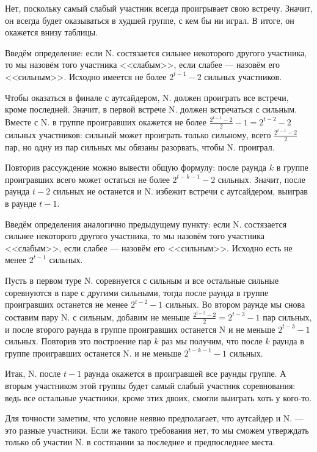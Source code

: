 \begin{itemize}
\itA Нет, поскольку самый слабый участник всегда проигрывает свою встречу.
Значит, он всегда будет оказываться в худшей группе, с кем бы ни играл.
В итоге, он окажется внизу таблицы.

\itB Введём определение: если N. состязается сильнее некоторого другого участника,
то мы назовём того участника <<слабым>>, если слабее --- назовём его <<сильным>>.
Исходно имеется не более $2^{t-1}-2$ сильных участников.

Чтобы оказаться в финале с аутсайдером, N. должен проиграть все встречи,
кроме последней. Значит, в первой встрече N. должен встречаться с сильным.
Вместе с N. в группе проигравших окажется не более $\frac{2^{t-1}-2}{2}-1 = 2^{t-2}-2$ 
сильных участников: сильный может проиграть только сильному, всего 
$\frac{2^{t-1}-2}{2}$ пар, но одну из пар сильных мы обязаны разорвать, чтобы 
N. проиграл.

Повторив рассуждение можно вывести общую формулу: после раунда $k$ 
в группе проигравших всего может остаться не более $2^{t-k-1}-2$ сильных. 
Значит, после раунда $t-2$ сильных не останется и N. избежит встречи с аутсайдером, 
выиграв в раунде $t-1$.

\itC Введём определения аналогично предыдущему пункту: если N. состязается сильнее 
некоторого другого участника, то мы назовём того участника <<слабым>>, если 
слабее --- назовём его <<сильным>>. Исходно есть не менее $2^{t-1}$ сильных. 

Пусть в первом туре N. соревнуется с сильным и все остальные сильные соревнуются 
в паре с другими сильными, 
тогда после раунда в группе проигравших останется не менее $2^{t-2}-1$ сильных.
Во втором раунде мы снова составим пару N. с сильным, добавим не меньше $\frac{2^{t-2}-2}{2} = 2^{t-3}-1$ 
пар сильных, и после второго раунда в группе проигравших останется N и
не меньше $2^{t-3}-1$ сильных. Повторив это построение пар $k$ раз
мы получим, что после $k$ раунда в группе проигравших останется N. и не меньше $2^{t-k-1}-1$ сильных. 

Итак, N. после $t-1$ раунда окажется в проигравшей все раунды 
группе. А вторым участником этой группы будет самый слабый участник соревнования:
ведь все остальные участники, кроме этих двоих, смогли выиграть хоть у кого-то. 

Для точности заметим, что условие неявно предполагает, что аутсайдер и N. --- 
это разные участники. Если же такого требования нет, то мы сможем утверждать только
об участии N. в состязании за последнее и предпоследнее места.
\end{itemize}
